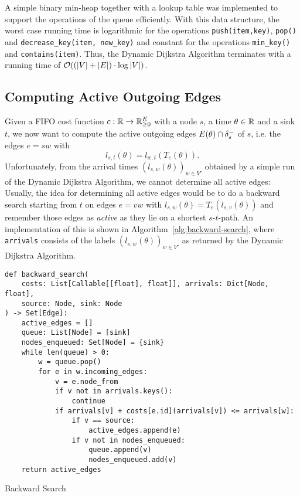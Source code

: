 A simple binary min-heap together with a lookup table was implemented to support the operations of the queue efficiently.
With this data structure, the worst case running time is logarithmic for the operations \texttt{push(item,key)}, \texttt{pop()} and \texttt{decrease\_key(item, new\_key)} and constant for the operations \texttt{min\_key()} and \texttt{contains(item)}.
Thus, the Dynamic Dijkstra Algorithm terminates with a running time of $\mathcal{O}( (\left| V \right| + \left| E \right|) \cdot \log \left| V \right|)$.


\subsection{Computing Active Outgoing Edges}\label{sec:compute-active-edges}

Given a FIFO cost function $c: \mathbb{R}\rightarrow\mathbb{R}_{\geq0}^E$ with a node $s$, a time $\theta\in\mathbb{R}$ and a sink $t$, we now want to compute the active outgoing edges $E(\theta) \cap \delta^-_{s}$ of $s$, i.e. the edges $e=sw$ with 
\[
    l_{s,t}(\theta) = l_{w,t}(T_e(\theta)).
\]
Unfortunately, from the arrival times $(l_{s,w}(\theta))_{w\in V'}$ obtained by a simple run of the Dynamic Dijkstra Algorithm, we cannot determine all active edges:
Usually, the idea for determining all active edges would be to do a backward search starting from $t$ on edges $e=vw$ with $l_{s,w}(\theta) = T_e(l_{s,v}(\theta))$ and remember those edges as \emph{active} as they lie on a shortest $s$-$t$-path.
An implementation of this is shown in Algorithm~\ref{alg:backward-search}, where \texttt{arrivals} consists of the labels $(l_{s,w}(\theta))_{w\in V'}$ as returned by the Dynamic Dijkstra Algorithm.

\begin{algorithm}[h]
    \begin{verbatim}
def backward_search(
    costs: List[Callable[[float], float]], arrivals: Dict[Node, float],
    source: Node, sink: Node
) -> Set[Edge]:
    active_edges = []
    queue: List[Node] = [sink]
    nodes_enqueued: Set[Node] = {sink}
    while len(queue) > 0:
        w = queue.pop()
        for e in w.incoming_edges:
            v = e.node_from
            if v not in arrivals.keys():
                continue
            if arrivals[v] + costs[e.id](arrivals[v]) <= arrivals[w]:
                if v == source:
                    active_edges.append(e)
                if v not in nodes_enqueued:
                    queue.append(v)
                    nodes_enqueued.add(v)
    return active_edges
    \end{verbatim}
    \caption{Backward Search}
    \label{alg:backward-search}
\end{algorithm}

